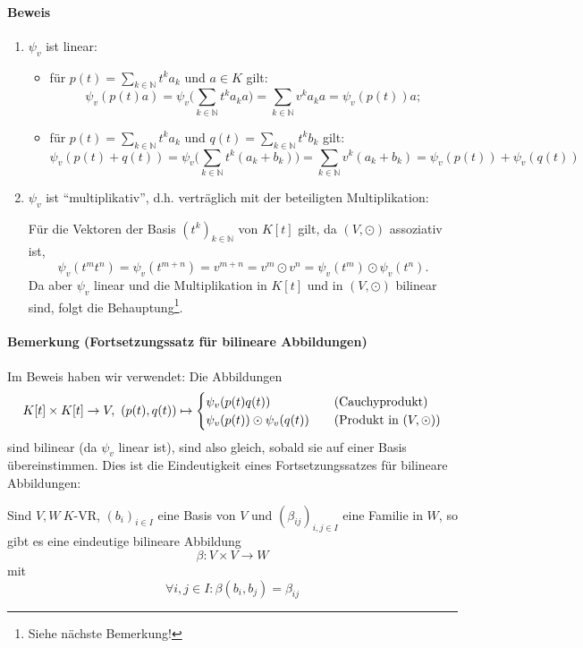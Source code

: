 \paragraph{Beweis}
	\begin{enumerate}
		\item $ \psi_v $ ist linear:
			\begin{itemize}
				\item für $ p(t) = \sum_{k\in\mathbb{N}} t^ka_k $ und $ a\in K $ gilt:
					\[ \psi_v(p(t)a) = \psi_v\Big(\sum_{k\in\mathbb{N}} t^ka_ka\Big) = \sum_{k\in\mathbb{N}} v^ka_ka = \psi_v(p(t))a; \]
				\item für $ p(t) = \sum_{k\in\mathbb{N}} t^ka_k $ und $ q(t) = \sum_{k\in\mathbb{N}} t^k b_k $ gilt:
					\[ \psi_v(p(t)+q(t)) = \psi_v\Big(\sum_{k\in\mathbb{N}}t^k(a_k+b_k)\Big) = \sum_{k\in\mathbb{N}} v^k(a_k+b_k) = \psi_v(p(t))+\psi_v(q(t)) \]
			\end{itemize}
		\item $ \psi_v $ ist "`multiplikativ"', d.h. verträglich mit der beteiligten Multiplikation:
		
			Für die Vektoren der Basis $ (t^k)_{k\in\mathbb{N}} $ von $ K[t] $ gilt, da $ (V,\odot) $ assoziativ ist,
				\[ \psi_v(t^mt^n) = \psi_v(t^{m+n}) = v^{m+n} = v^m\odot v^n = \psi_v(t^m)\odot \psi_v(t^n). \]
			Da aber $ \psi_v $ linear und die Multiplikation in $ K[t] $ und in $ (V,\odot) $ bilinear sind, folgt die Behauptung\footnote{Siehe nächste Bemerkung!}.
	\end{enumerate}
\paragraph{Bemerkung (Fortsetzungssatz für bilineare Abbildungen)}
	Im Beweis haben wir verwendet: Die Abbildungen
		\[ K[t]\times K[t]\to V,\ (p(t),q(t))\mapsto
			\begin{cases}
				\psi_v(p(t)q(t))               & \quad\text{(Cauchyprodukt)}       \\
				\psi_v(p(t))\odot \psi_v(q(t)) & \quad\text{(Produkt in $ (V,\odot) $)}
			\end{cases}
		\]
	sind bilinear (da $ \psi_v $ linear ist), sind also gleich, sobald sie auf einer Basis übereinstimmen.
	Dies ist die Eindeutigkeit eines Fortsetzungssatzes für bilineare Abbildungen:
	
	\begin{Satz}
	Sind $ V,W\ K$-VR, $ (b_i)_{i\in I} $ eine Basis von $ V $ und $ (\beta_{ij})_{i,j\in I} $ eine Familie in $ W $, so gibt es eine eindeutige bilineare Abbildung
		\[ \beta: V\times V\to W \]
	mit
		\[ \forall i,j\in I: \beta(b_i,b_j) = \beta_{ij} \]
	\end{Satz}
	
